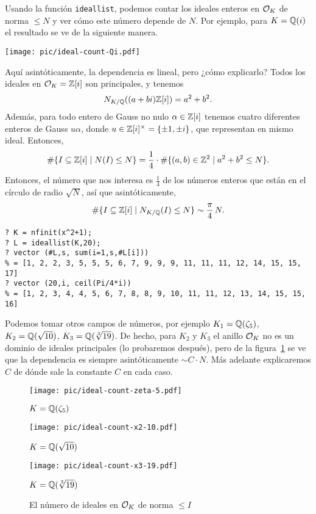 Usando la función \texttt{ideallist}, podemos contar los ideales enteros en
$\mathcal{O}_K$ de norma $\le N$ y ver cómo este número depende de $N$. Por ejemplo,
para $K = \mathbb{Q} (i)$ el resultado se ve de la siguiente manera.

\begin{center}
  \texttt{[image: pic/ideal-count-Qi.pdf]}
\end{center}

Aquí asintóticamente, la dependencia es lineal, pero ¿cómo explicarlo?
Todos los ideales en $\mathcal{O}_K = \mathbb{Z}[i]$ son principales, y tenemos
$$N_{K/\mathbb{Q}} ((a+bi)\mathbb{Z}[i]) = a^2 + b^2.$$
Además, para todo entero de Gauss no nulo $\alpha \in \mathbb{Z}[i]$ tenemos cuatro
diferentes enteros de Gauss $u\alpha$, donde
$u \in \mathbb{Z}[i]^\times = \{ \pm 1, \pm i \}$, que representan en mismo ideal.
Entonces,
\[ \#\{ I \subseteq \mathbb{Z} [i] \mid N (I) \le N \} =
   \frac{1}{4}\cdot \# \{ (a,b) \in \mathbb{Z}^2 \mid a^2 + b^2 \le N \}. \]
Entonces, el número que nos interesa es $\frac{1}{4}$ de los números
enteros que están en el círculo de radio $\sqrt{N}$, así que asintóticamente,
\[ \#\{ I \subseteq \mathbb{Z} [i] \mid N_{K/\mathbb{Q}} (I) \le N \} \sim \frac{\pi}{4}\,N. \]

\begin{shaded}
\begin{verbatim}
? K = nfinit(x^2+1);
? L = ideallist(K,20);
? vector (#L,s, sum(i=1,s,#L[i]))
% = [1, 2, 2, 3, 5, 5, 5, 6, 7, 9, 9, 9, 11, 11, 11, 12, 14, 15, 15, 17]
? vector (20,i, ceil(Pi/4*i))
% = [1, 2, 3, 4, 4, 5, 6, 7, 8, 8, 9, 10, 11, 11, 12, 13, 14, 15, 15, 16]
\end{verbatim}
\end{shaded}

Podemos tomar otros campos de números, por ejemplo $K_1 = \mathbb{Q} (\zeta_5)$,
$K_2 = \mathbb{Q} (\sqrt{10})$, $K_3 = \mathbb{Q} (\sqrt[3]{19})$. De hecho, para $K_2$ y
$K_3$ el anillo $\mathcal{O}_K$ no es un dominio de ideales principales (lo probaremos
después), pero de la figura~\ref{fig:numero-de-ideales} se ve que la dependencia
es siempre asintóticamente $\sim C\cdot N$. Más adelante explicaremos $C$ de dónde
sale la constante $C$ en cada caso.

\begin{figure}
  \begin{center}
    \texttt{[image: pic/ideal-count-zeta-5.pdf]}

    $K = \mathbb{Q} (\zeta_5)$
  \end{center}

  \begin{center}
    \texttt{[image: pic/ideal-count-x2-10.pdf]}

    $K = \mathbb{Q} (\sqrt{10})$
  \end{center}

  \begin{center}
    \texttt{[image: pic/ideal-count-x3-19.pdf]}

    $K = \mathbb{Q} (\sqrt[3]{19})$
  \end{center}

  \caption{El número de ideales en $\mathcal{O}_K$ de norma $\le I$}
  \label{fig:numero-de-ideales}
\end{figure}

